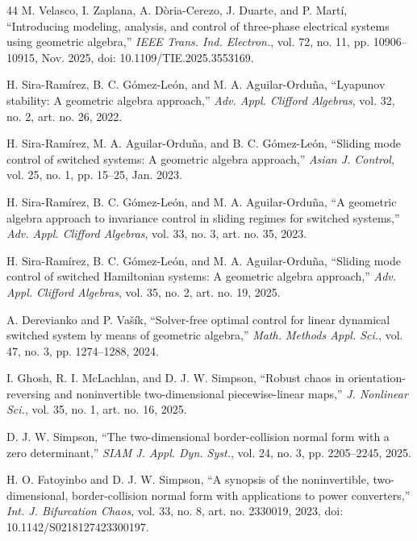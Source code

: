 \documentclass[journal]{IEEEtran}
\begin{document}
\begin{thebibliography}{44}
 M. Velasco, I. Zaplana, A. D\`oria-Cerezo,
J. Duarte, and P. Mart\'i, ``Introducing modeling, analysis, and control of
three-phase electrical systems using geometric algebra,'' \emph{IEEE Trans.
Ind. Electron.}, vol. 72, no. 11, pp. 10906--10915, Nov. 2025, doi:
10.1109/TIE.2025.3553169.

 H. Sira-Ram\'irez, B. C. G\'omez-Le\'on, and
M. A. Aguilar-Ordu\~na, ``Lyapunov stability: A geometric algebra
approach,'' \emph{Adv. Appl. Clifford Algebras}, vol. 32, no. 2,
art. no. 26, 2022.

 H. Sira-Ram\'irez, M. A. Aguilar-Ordu\~na, and
B. C. G\'omez-Le\'on, ``Sliding mode control of switched systems: A
geometric algebra approach,'' \emph{Asian J. Control}, vol. 25, no. 1,
pp. 15--25, Jan. 2023.

 H. Sira-Ram\'irez, B. C. G\'omez-Le\'on, and
M. A. Aguilar-Ordu\~na, ``A geometric algebra approach to invariance control
in sliding regimes for switched systems,'' \emph{Adv. Appl. Clifford
Algebras}, vol. 33, no. 3, art. no. 35, 2023.

 H. Sira-Ram\'irez, B. C. G\'omez-Le\'on, and
M. A. Aguilar-Ordu\~na, ``Sliding mode control of switched Hamiltonian
systems: A geometric algebra approach,'' \emph{Adv. Appl. Clifford
Algebras}, vol. 35, no. 2, art. no. 19, 2025.

 A. Derevianko and P. Va\v{s}\'ik,
``Solver-free optimal control for linear dynamical switched system by means
of geometric algebra,'' \emph{Math. Methods Appl. Sci.}, vol. 47, no. 3,
pp. 1274--1288, 2024.

 I. Ghosh, R. I. McLachlan, and D. J. W. Simpson,
``Robust chaos in orientation-reversing and noninvertible two-dimensional
piecewise-linear maps,'' \emph{J. Nonlinear Sci.}, vol. 35, no. 1,
art. no. 16, 2025.

 D. J. W. Simpson, ``The two-dimensional
border-collision normal form with a zero determinant,'' \emph{SIAM J.
Appl. Dyn. Syst.}, vol. 24, no. 3, pp. 2205--2245, 2025.

 H. O. Fatoyinbo and D. J. W. Simpson,
``A synopsis of the noninvertible, two-dimensional, border-collision normal
form with applications to power converters,'' \emph{Int. J. Bifurcation
Chaos}, vol. 33, no. 8, art. no. 2330019, 2023,
doi: 10.1142/S0218127423300197.


\end{thebibliography}
\end{document}
